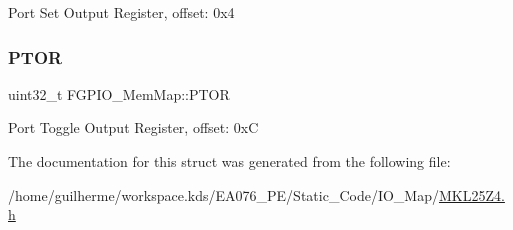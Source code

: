 Port Set Output Register, offset\+: 0x4 \mbox{\label{struct_f_g_p_i_o___mem_map_aa07e31d4362b7c29a10592d24511198c}} 
\subsubsection{\texorpdfstring{P\+T\+OR}{PTOR}}
{\footnotesize\ttfamily uint32\+\_\+t F\+G\+P\+I\+O\+\_\+\+Mem\+Map\+::\+P\+T\+OR}

Port Toggle Output Register, offset\+: 0xC 

The documentation for this struct was generated from the following file\+:\begin{DoxyCompactItemize}
\item 
/home/guilherme/workspace.\+kds/\+E\+A076\+\_\+\+P\+E/\+Static\+\_\+\+Code/\+I\+O\+\_\+\+Map/\hyperlink{_m_k_l25_z4_8h}{M\+K\+L25\+Z4.\+h}\end{DoxyCompactItemize}

